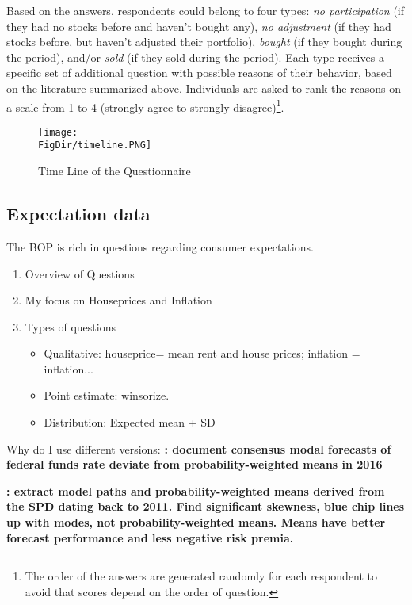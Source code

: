\documentclass[ProjectABM]{subfiles}
\begin{document}
Based on the answers, respondents could belong to four types: \textit{no participation} (if they had no stocks before and haven't bought any), \textit{no adjustment} (if they had stocks before, but haven't adjusted their portfolio), \textit{bought} (if they bought during the period), and/or \textit{sold} (if they sold during the period). Each type receives a specific set of additional question with possible reasons of their behavior, based on the literature summarized above. Individuals are asked to rank the reasons on a scale from 1 to 4 (strongly agree to strongly disagree)\footnote{ The order of the answers are generated randomly for each respondent to avoid that scores depend on the order of question.}.


\begin{figure}
	\centering
	\texttt{[image: \\FigDir/timeline.PNG]}
	\caption{Time Line of the Questionnaire}
	\label{fig:timeline}
\end{figure}

\subsection{Expectation data}
The BOP is rich in questions regarding consumer expectations. 
\begin{enumerate}
	\item Overview of Questions
	\item My focus on Houseprices and Inflation
	\item Types of questions
	\begin{itemize}
		\item Qualitative: houseprice= mean rent and house prices; inflation = inflation...
		\item Point estimate: winsorize. 
		\item Distribution: Expected mean + SD
	\end{itemize}
\end{enumerate}

Why do I use different versions:
\textbf{\cite{potter_et_al_2017prob}: document consensus modal forecasts of federal funds rate deviate from probability-weighted means in 2016}

\textbf{\cite{diercks2021asymmetric}: extract model paths and probability-weighted means derived from the SPD dating back to 2011. Find significant skewness, blue chip lines up with modes, not probability-weighted means. Means have better forecast performance and less negative risk premia.}
\end{document}
